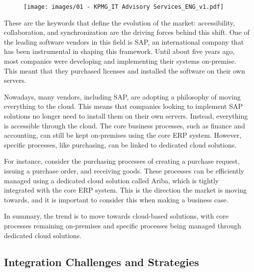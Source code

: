 \begin{figure}[!h]
    \centering
    \texttt{[image: images/01 - KPMG\_IT Advisory Services\_ENG\_v1.pdf]}
\end{figure}

These are the keywords that define the evolution of the
market: accessibility, collaboration, and synchronization are the
driving forces behind this shift. One of the leading software vendors in
this field is SAP, an international company that has been instrumental
in shaping this framework. Until about five years ago, most companies
were developing and implementing their systems on-premise. This meant
that they purchased licenses and installed the software on their own
servers.

Nowadays, many vendors, including SAP, are adopting a philosophy of
moving everything to the cloud. This means that companies looking to
implement SAP solutions no longer need to install them on their own
servers. Instead, everything is accessible through the cloud. The core
business processes, such as finance and accounting, can still be kept
on-premises using the core ERP system. However, specific processes, like
purchasing, can be linked to dedicated cloud solutions.

For instance, consider the purchasing processes of creating a purchase request, issuing a purchase order, and receiving goods. These processes can be efficiently managed using a dedicated cloud solution called Ariba\footnotemark{}, which is tightly integrated with the core ERP system. This is the direction the market is moving towards, and it is important to consider this when making a business case.

In summary, the trend is to move towards cloud-based solutions, with
core processes remaining on-premises and specific processes being
managed through dedicated cloud solutions.



\subsection{Integration Challenges and
    Strategies}\label{integration-challenges-and-strategies}

